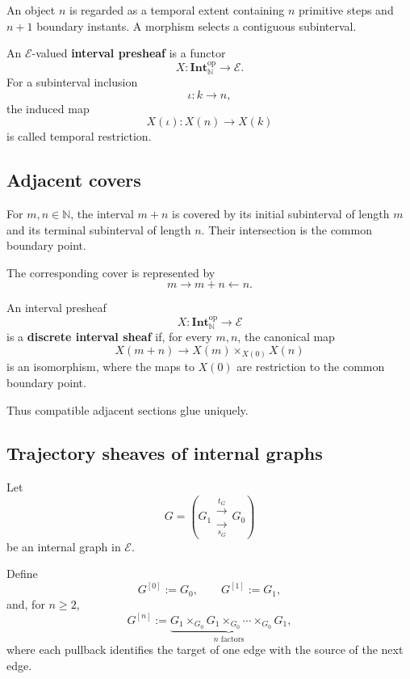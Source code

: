 An object \(n\) is regarded as a temporal extent containing \(n\) primitive
steps and \(n+1\) boundary instants. A morphism selects a contiguous
subinterval.

\begin{definition}
\label{def:internal-interval-presheaf}
An \(\mathcal E\)-valued \textbf{interval presheaf} is a functor
\[
    X:\mathbf{Int}_{\mathbb N}^{\mathrm{op}}\to\mathcal E.
\]
For a subinterval inclusion
\[
    \iota:k\to n,
\]
the induced map
\[
    X(\iota):X(n)\to X(k)
\]
is called temporal restriction.
\end{definition}

\subsection{Adjacent covers}
\label{subsec:adjacent-interval-covers}

For \(m,n\in\mathbb N\), the interval \(m+n\) is covered by its initial
subinterval of length \(m\) and its terminal subinterval of length \(n\).
Their intersection is the common boundary point.

The corresponding cover is represented by
\[
    m\longrightarrow m+n
    \longleftarrow n.
\]

\begin{definition}
\label{def:discrete-interval-sheaf}
An interval presheaf
\[
    X:\mathbf{Int}_{\mathbb N}^{\mathrm{op}}\to\mathcal E
\]
is a \textbf{discrete interval sheaf} if, for every \(m,n\), the canonical map
\[
    X(m+n)\longrightarrow
    X(m)\times_{X(0)}X(n)
\]
is an isomorphism, where the maps to \(X(0)\) are restriction to the common
boundary point.
\end{definition}

Thus compatible adjacent sections glue uniquely.

\subsection{Trajectory sheaves of internal graphs}
\label{subsec:trajectory-sheaves-internal-graphs}

Let
\[
    G=
    \left(
    G_1
    \mathrel{\substack{\xrightarrow{t_G}\\[-0.4em]\xrightarrow[s_G]{}}}
    G_0
    \right)
\]
be an internal graph in \(\mathcal E\).

\begin{definition}
\label{def:internal-graph-path-objects}
Define
\[
    G^{[0]}:=G_0,
    \qquad
    G^{[1]}:=G_1,
\]
and, for \(n\geq 2\),
\[
    G^{[n]}
    :=
    \underbrace{
    G_1\times_{G_0}G_1\times_{G_0}\cdots\times_{G_0}G_1
    }_{n\text{ factors}},
\]
where each pullback identifies the target of one edge with the source of the
next edge.
\end{definition}

